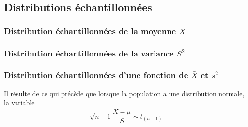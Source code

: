 \subsection{Distributions échantillonnées}

\subsubsection{Distribution échantillonnées de la moyenne $\bar{X}$}
\subsubsection{Distribution échantillonnées de la variance $S^2$}



\newpage
\subsubsection{Distribution échantillonnées d'une fonction de $\bar{X}$ et $s^2$}
Il résulte de ce qui précède que lorsque la population a une distribution normale, la variable
$$\boxed{\sqrt{n-1}\dfrac{\bar{X}-\mu}{S} \sim t_{(n-1)}}$$
